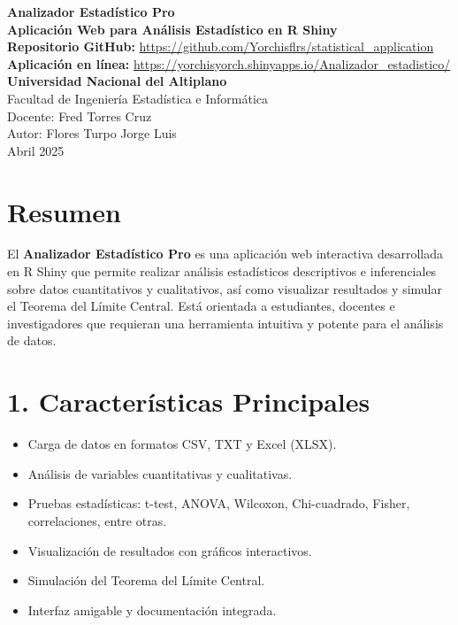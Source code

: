 \documentclass[12pt]{article}
\begin{document}
\begin{center}
    {\LARGE \textbf{Analizador Estadístico Pro}} \\[2mm]
    \vspace{2mm}
    \textbf{Aplicación Web para Análisis Estadístico en R Shiny} \\[5mm]
    
    \textbf{Repositorio GitHub:} \url{https://github.com/Yorchisflrs/statistical_application} \\[1mm]
    \textbf{Aplicación en línea:} \url{https://yorchisyorch.shinyapps.io/Analizador_estadistico/} \\[8mm]
    \textbf{Universidad Nacional del Altiplano} \\ Facultad de Ingeniería Estadística e Informática \\ Docente: Fred Torres Cruz \\ Autor: Flores Turpo Jorge Luis \\ Abril 2025
\end{center}

\vspace{8mm}

\section*{Resumen}
El \textbf{Analizador Estadístico Pro} es una aplicación web interactiva desarrollada en R Shiny que permite realizar análisis estadísticos descriptivos e inferenciales sobre datos cuantitativos y cualitativos, así como visualizar resultados y simular el Teorema del Límite Central. Está orientada a estudiantes, docentes e investigadores que requieran una herramienta intuitiva y potente para el análisis de datos.

\section*{1. Características Principales}
\begin{itemize}
    \item Carga de datos en formatos CSV, TXT y Excel (XLSX).
    \item Análisis de variables cuantitativas y cualitativas.
    \item Pruebas estadísticas: t-test, ANOVA, Wilcoxon, Chi-cuadrado, Fisher, correlaciones, entre otras.
    \item Visualización de resultados con gráficos interactivos.
    \item Simulación del Teorema del Límite Central.
    \item Interfaz amigable y documentación integrada.
\end{itemize}
\end{document}
